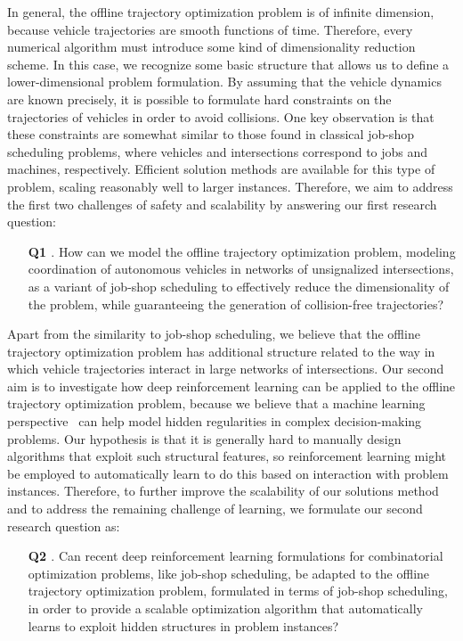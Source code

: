 \documentclass{article}
\makeatletter
\def\namedlabel#1#2{\begingroup
    #2%
    \def\@currentlabel{#2}%
    \phantomsection\label{#1}\endgroup
}
\theoremstyle{definition}
\theoremstyle{plain}
\makeatother
\begin{document}
In general, the offline trajectory optimization problem is of infinite
dimension, because vehicle trajectories are smooth functions of time. Therefore,
every numerical algorithm must introduce some kind of dimensionality reduction
scheme. In this case, we recognize some basic structure that allows us to define
a lower-dimensional problem formulation.
%
By assuming that the vehicle dynamics are known precisely, it is possible to
formulate hard constraints on the trajectories of vehicles in order to avoid
collisions. One key observation is that these constraints are somewhat similar
to those found in classical job-shop scheduling problems, where vehicles and
intersections correspond to jobs and machines, respectively. Efficient solution
methods are available for this type of problem, scaling reasonably well to
larger instances.
%
Therefore, we aim to address the first two challenges of safety and scalability
by answering our first research question:
%
\begin{enumerate}
  \item[\textbf{\namedlabel{Q1}{Q1}}.] How can we model the offline trajectory optimization
        problem, modeling coordination of autonomous vehicles in networks of
        unsignalized intersections, as a variant of job-shop scheduling to
        effectively reduce the dimensionality of the problem, while guaranteeing
        the generation of collision-free trajectories?
\end{enumerate}

Apart from the similarity to job-shop scheduling, we believe that the offline
trajectory optimization problem has additional structure related to the way in
which vehicle trajectories interact in large networks of intersections. Our
second aim is to investigate how deep reinforcement learning can be applied to
the offline trajectory optimization problem, because we believe that a machine
learning perspective~\cite{bengioMachineLearningCombinatorial2020} can help model hidden regularities in complex
decision-making problems. Our hypothesis is that it is generally hard to
manually design algorithms that exploit such structural features, so
reinforcement learning might be employed to automatically learn to do this based
on interaction with problem instances. Therefore, to further improve the scalability of
our solutions method and to address the remaining challenge of learning, we
formulate our second research question as:
%
\begin{enumerate}
  \item[\textbf{\namedlabel{Q2}{Q2}}.] Can recent deep reinforcement learning formulations for
        combinatorial optimization problems, like job-shop scheduling, be
        adapted to the offline trajectory optimization problem, formulated in
        terms of job-shop scheduling, in order to provide a scalable
        optimization algorithm that automatically learns to exploit hidden
        structures in problem instances?
\end{enumerate}
\end{document}
